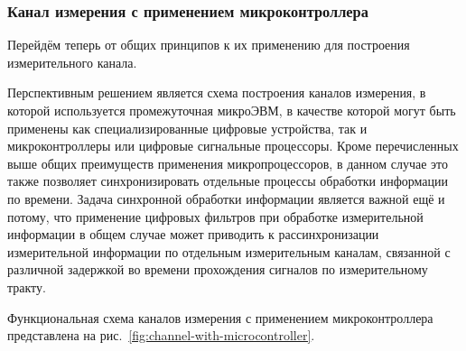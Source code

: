 \documentclass[a4paper, 14pt, titlepage]{extarticle}
\begin{document}
  \subsubsection{Канал измерения с применением микроконтроллера}

  Перейдём теперь от общих принципов к их применению для построения измерительного канала.

  Перспективным решением является схема построения каналов измерения, в которой
  используется промежуточная микроЭВМ, в качестве которой могут быть применены как
  специализированные цифровые устройства, так и микроконтроллеры или цифровые сигнальные процессоры.
  Кроме перечисленных выше общих преимуществ применения микропроцессоров, в данном случае это также
  позволяет синхронизировать отдельные процессы обработки информации по времени. Задача синхронной обработки информации
  является важной ещё и потому, что применение цифровых фильтров при обработке измерительной
  информации в общем случае может приводить к рассинхронизации измерительной информации по отдельным
  измерительным каналам, связанной с различной задержкой во времени прохождения сигналов по
  измерительному тракту.

  Функциональная схема каналов измерения с применением микроконтроллера  представлена на
  рис.~\ref{fig:channel-with-microcontroller}.
\end{document}
